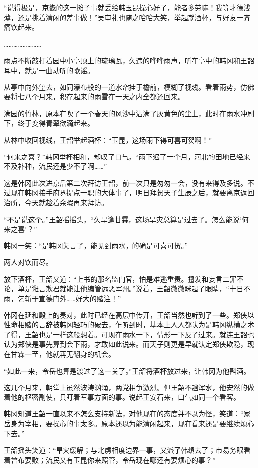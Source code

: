 “说得极是，京畿的这一摊子事就丢给韩玉昆操心好了，能者多劳嘛！我等才德浅薄，还是挑着清闲的差事做！”吴审礼也随之哈哈大笑，举起就酒杯，与好友一齐痛饮起来。

……………………

雨点不断敲打着园中小亭顶上的琉璃瓦，久违的哗哗雨声，听在亭中的韩冈和王韶耳中，就是一曲动听的歌谣。

从亭中向外望去，如同瀑布般的一道水帘挂于檐前，模糊了视线。看着雨势，仿佛要将七八个月来，积存起来的雨雪在一天之内全都还回来。

满园的竹林，原本在吹了一个春天的风沙中沾满了灰黄色的尘土，此时在雨水冲刷下，终于变得青翠欲滴起来。

从林中收回视线，王韶举起酒杯：“玉昆，这场雨下得可喜可贺啊！”

“何来之喜？”韩冈举杯相和，却叹了口气，“雨下迟了一个月，河北的田地已经来不及补种，流民还是少不了啊……”

这是韩冈此次进京后第二次拜访王韶，前一次只是匆匆一会，没有来得及多说。不过现在韩冈接手府界提点一职的大体事了，明日拜贺天子生辰之后，就要离京返回治所，今天就趁着余暇再来拜访。

“不是说这个。”王韶摇摇头，“久旱逢甘霖，这场旱灾总算是过去了。怎么能说‘何来之喜’？”

韩冈一笑：“是韩冈失言了，能见到雨水，的确是可喜可贺。”

两人对饮而尽。

放下酒杯，王韶又道：“上书的那名监门官，怕是难逃重责。擅发和妄言二罪不论，单是诳言欺君就能让他编管远恶军州。”说着，王韶微微眯起了眼睛，“十日不雨，乞斩于宣德门外……好大的赌注！”

韩冈在延和殿上的奏对，此时已经在高层中传开，王韶当然也听到了一些。郑侠以性命相赌的言辞被韩冈轻巧的破去，乍听到时，基本上人人都认为是韩冈纵横之术了得，王韶也是一样这般想着。可现在雨水一下，情形一下反了过来。就连王韶也认为郑侠是事先算到会下雨，才敢如此说来。而天子则更是早就认定郑侠欺隐，现在甘霖一至，他就再无翻身的机会。

“如此一来，令岳也算是渡过了这一关了。”王韶将酒杯放过来，让韩冈为他斟酒。

这几个月来，朝堂上虽然波涛汹涌，两党相争激烈。但王韶不趟浑水，他安然的做着他的枢密副使，只盯着军事方面的事。说起王安石来，口气如同一个看客。

韩冈知道王韶一直以来不怎么支持新法，对他现在的态度并不以为怪，笑道：“家岳身为宰相，要操心的事太多。原本还以为能清闲起来，现在看来还是要继续烦心下去。”

王韶摇头笑道：“旱灾缓解；与北虏相度边界一事，又派了韩缜去了；市易务眼看着曾布要败；流民又有玉昆你来照管，令岳现在哪还有要烦心的事？”

